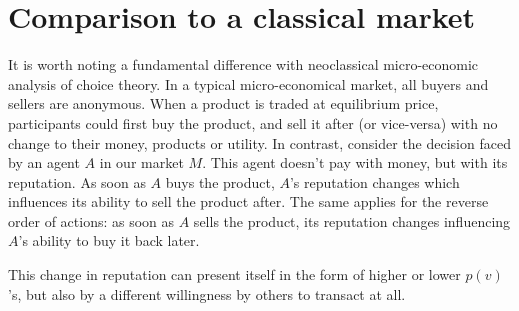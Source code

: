 \section{Comparison to a classical market}
It is worth noting a fundamental difference with neoclassical micro-economic analysis of choice theory. 
In a typical micro-economical market, 
all buyers and sellers are anonymous. 
When a product is traded at equilibrium price, 
participants could first buy the product, 
and sell it after (or vice-versa) with no change to their money, products or utility. 
In contrast, consider the decision faced by an agent $A$ in our market $M$. 
This agent doesn't pay with money, 
but with its reputation. 
As soon as $A$ buys the product, 
$A$'s reputation changes which influences its ability to sell the product after. 
The same applies for the reverse order of actions: 
as soon as $A$ sells the product, 
its reputation changes influencing $A$'s ability to buy it back later.

This change in reputation can present itself in the form of higher or lower $p(v)$'s, but also by a different willingness by others to transact at all.
